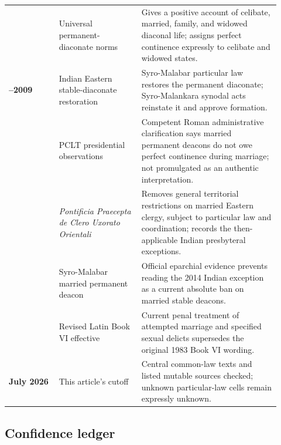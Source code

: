 \begin{longtable}{>{\bfseries\RaggedRight\arraybackslash}p{0.17\linewidth}>{\RaggedRight\arraybackslash}p{0.28\linewidth}>{\RaggedRight\arraybackslash}p{0.47\linewidth}}
1998 & Universal permanent-diaconate norms & Gives a positive account of celibate, married, family, and widowed diaconal life; assigns perfect continence expressly to celibate and widowed states.\\
2003--2009 & Indian Eastern stable-diaconate restoration & Syro-Malabar particular law restores the permanent diaconate; Syro-Malankara synodal acts reinstate it and approve formation.\\
2011 & PCLT presidential observations & Competent Roman administrative clarification says married permanent deacons do not owe perfect continence during marriage; not promulgated as an authentic interpretation.\\
2014 & \emph{Pontificia Praecepta de Clero Uxorato Orientali} & Removes general territorial restrictions on married Eastern clergy, subject to particular law and coordination; records the then-applicable Indian presbyteral exceptions.\\
2016 & Syro-Malabar married permanent deacon & Official eparchial evidence prevents reading the 2014 Indian exception as a current absolute ban on married stable deacons.\\
2021 & Revised Latin Book VI effective & Current penal treatment of attempted marriage and specified sexual delicts supersedes the original 1983 Book VI wording.\\
15 July 2026 & This article's cutoff & Central common-law texts and listed mutable sources checked; unknown particular-law cells remain expressly unknown.\\
\end{longtable}

\subsection{Confidence ledger}

